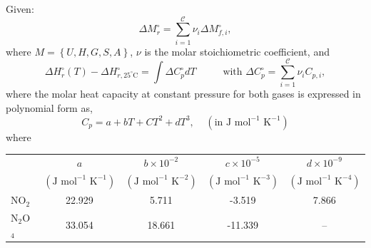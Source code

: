 \documentclass[calculator,allquestions,datasheet,solutions]{exam_newMarcus2}
\newcommand{\summation}[3][error]{\sum\limits_{#2}^{#3}#1}
\begin{document}
\begin{question}
\begin{enumerate}[a)]
{             }          
     \end{enumerate}
      Given:
         \begin{displaymath}
           \Delta M_{r}^{\circ} = \summation[\nu_{i}\Delta M_{f,i}^{\circ}]{i=1}{\mathcal{C}},%
         \end{displaymath}
         where $M=\left\{U,H,G,S,A\right\}$, $\nu$ is the molar stoichiometric coefficient, and
         \begin{displaymath}
            \Delta H_{r}^{\circ}(T) - \Delta H_{r,25^{\circ}\text{C}}^{\circ} = \int \Delta C_{p}^{\circ}dT \hspace{1cm} \text{ with } \Delta C_{p}^{\circ} = \summation[\nu_{i}C_{p,i}]{i=1}{\mathcal{C}},
         \end{displaymath}
     where the molar heat capacity at constant pressure for both gases is expressed in polynomial form as,
  \begin{displaymath}
    C_{p} = a + bT + CT^{2} + dT^{3}, \;\;\;\;\left(\text{in J mol}^{-1}\text{ K}^{-1}\right)
  \end{displaymath}
  where
  \begin{center}
    \begin{tabular}{ l | c c c c }
      \hline
                         &  $a$     &  $b\times 10^{-2}$  & $c\times 10^{-5}$  & $d\times 10^{-9}$ \\
                         &$\left(\text{J mol}^{-1}\text{ K}^{-1}\right)$& $\left(\text{J mol}^{-1}\text{ K}^{-2}\right)$& $\left(\text{J mol}^{-1}\text{ K}^{-3}\right)$& $\left(\text{J mol}^{-1}\text{ K}^{-4}\right)$ \\
      \hline
      NO$_{2}$             &  22.929 &      5.711          & -3.519            & 7.866 \\
      N$_{2}$O$_{4}$       &   33.054 &      18.661         &    -11.339        &  -- 
    \end{tabular}
  \end{center}
\end{question}

\clearpage
\end{document}
